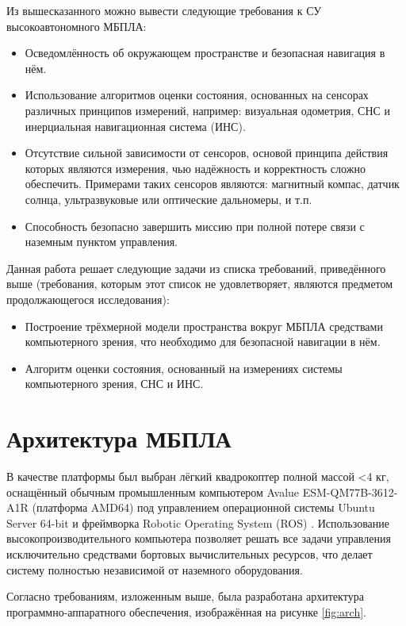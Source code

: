 \documentclass[12pt,a4paper]{article}
\begin{document}
Из вышесказанного можно вывести следующие требования к СУ высокоавтономного МБПЛА:

\begin{itemize}
    \item Осведомлённость об окружающем пространстве и безопасная навигация в нём.
    \item Использование алгоритмов оценки состояния, основанных на сенсорах различных принципов измерений, например: визуальная одометрия, СНС и инерциальная навигационная система (ИНС).
    \item Отсутствие сильной зависимости от сенсоров, основой принципа действия которых являются измерения, чью надёжность и корректность сложно обеспечить. Примерами таких сенсоров являются: магнитный компас, датчик солнца, ультразвуковые или оптические дальномеры, и т.п.
    \item Способность безопасно завершить миссию при полной потере связи с наземным пунктом управления.
\end{itemize}

Данная работа решает следующие задачи из списка требований, приведённого выше (требования, которым этот список не удовлетворяет, являются предметом продолжающегося исследования):

\begin{itemize}
    \item Построение трёхмерной модели пространства вокруг МБПЛА средствами компьютерного зрения, что необходимо для безопасной навигации в нём.
    \item Алгоритм оценки состояния, основанный на измерениях системы компьютерного зрения, СНС и ИНС.
\end{itemize}

\section{Архитектура МБПЛА}

В качестве платформы был выбран лёгкий квадрокоптер полной массой <4 кг, оснащённый обычным промышленным компьютером Avalue ESM-QM77B-3612-A1R (платформа AMD64) под управлением операционной системы Ubuntu Server 64-bit и фреймворка Robotic Operating System (ROS) \cite{ROS}. Использование высокопроизводительного компьютера позволяет решать все задачи управления исключительно средствами бортовых вычислительных ресурсов, что делает систему полностью независимой от наземного оборудования.

Согласно требованиям, изложенным выше, была разработана архитектура программно-аппаратного обеспечения, изображённая на рисунке \ref{fig:arch}.
\end{document}
